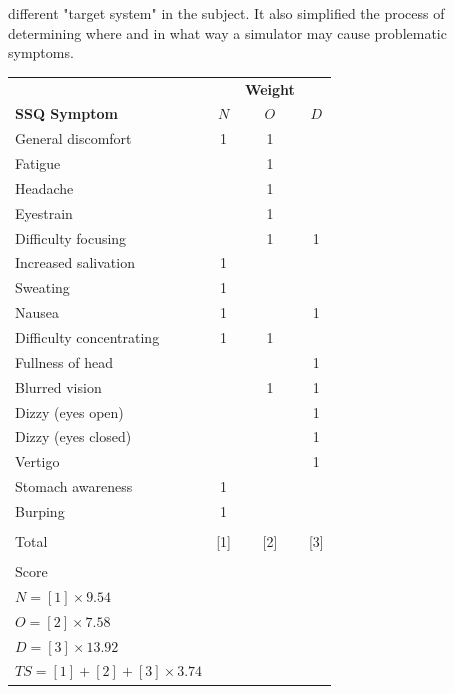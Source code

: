 different "target system" in the subject.
It also simplified the process of determining where and in what way a simulator may cause problematic
symptoms.
\begin{center}
    \begin{tabular}{ l c c c}
        \toprule
        \textbf{ } & \textbf{ } & \textbf{Weight} & \textbf{ } \\
        \textbf{SSQ Symptom} & \textbf{$N$} & \textbf{$O$} & \textbf{$D$} \\
        \midrule
        General discomfort          & 1 & 1 &   \\
        Fatigue                     &   & 1 &   \\
        Headache                    &   & 1 &   \\
        Eyestrain                   &   & 1 &   \\
        Difficulty focusing         &   & 1 & 1 \\
        Increased salivation        & 1 &   &   \\
        Sweating                    & 1 &   &   \\
        Nausea                      & 1 &   & 1 \\
        Difficulty concentrating    & 1 & 1 &   \\
        Fullness of head            &   &   & 1 \\
        Blurred vision              &   & 1 & 1 \\
        Dizzy (eyes open)           &   &   & 1 \\
        Dizzy (eyes closed)         &   &   & 1 \\
        Vertigo                     &   &   & 1 \\
        Stomach awareness           & 1 &   &   \\
        Burping                     & 1 &   &   \\
        \\
        Total                       & [1] & [2] & [3] \\
        \\
        Score & & & \\
        $N = [1] \times 9.54$ & & & \\
        $O = [2] \times 7.58$ & & & \\
        $D = [3] \times 13.92$ & & & \\
        $TS = [1] + [2] + [3] \times 3.74$ & & & \\
        \bottomrule
    \end{tabular}
    \label{tab:ssq-scoring}
\end{center}
